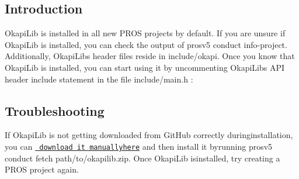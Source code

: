 \subsection*{Introduction}

Okapi\+Lib is installed in all new P\+R\+OS projects by default. If you are unsure if Okapi\+Lib is installed, you can check the output of {\ttfamily prosv5 conduct info-\/project}. Additionally, Okapi\+Lib\textquotesingle{}s header files reside in {\ttfamily include/okapi}. Once you know that Okapi\+Lib is installed, you can start using it by uncommenting Okapi\+Lib\textquotesingle{}s A\+PI header include statement in the file {\ttfamily include/main.\+h} \+:


\begin{DoxyCode}{0}
\DoxyCodeLine{}
\DoxyCodeLine{/**}
\DoxyCodeLine{ */}
\end{DoxyCode}


\subsection*{Troubleshooting}

If Okapi\+Lib is not getting downloaded from Git\+Hub correctly duringinstallation, you can \href{https://github.com/OkapiLib/OkapiLib/releases}{\texttt{ download it manuallyhere}} and then install it byrunning {\ttfamily prosv5 conduct fetch path/to/okapilib.\+zip}. Once Okapi\+Lib isinstalled, try creating a P\+R\+OS project again. 